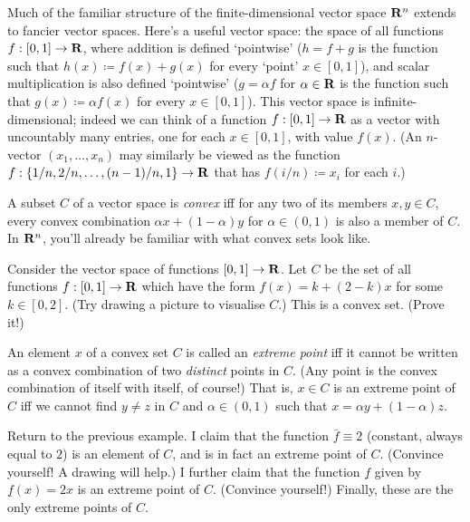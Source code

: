\documentclass[11pt,letterpaper,reqno,oneside]{book}
\begin{document}
\begin{appendices}
Much of the familiar structure of the finite-dimensional vector space $\mathbf{R}^n$ extends to fancier vector spaces.
Here's a useful vector space: the space of all functions $f : [0,1] \to \mathbf{R}$,
where addition is defined `pointwise' ($h = f+g$ is the function such that $h(x) \coloneqq f(x) + g(x)$ for every `point' $x \in [0,1]$),
and scalar multiplication is also defined `pointwise' ($g = \alpha f$ for $\alpha \in \mathbf{R}$ is the function such that $g(x) \coloneqq \alpha f(x)$ for every $x \in [0,1]$).
This vector space is infinite-dimensional;
indeed we can think of a function $f : [0,1] \to \mathbf{R}$ as a vector with uncountably many entries, one for each $x \in [0,1]$, with value $f(x)$.
(An $n$-vector $(x_1,\dots,x_n)$ may similarly be viewed as the function $f : \{1/n,2/n,\dots,(n-1)/n,1\} \to \mathbf{R}$ that has $f(i/n) \coloneqq x_i$ for each $i$.)

A subset $C$ of a vector space is \emph{convex} iff
for any two of its members $x,y \in C$,
every convex combination $\alpha x + (1-\alpha) y$ for $\alpha \in (0,1)$
is also a member of $C$.
In $\mathbf{R}^n$, you'll already be familiar with what convex sets look like.

\setcounter{example}{1}
\begin{example}
	\label{example:fg}
	Consider the vector space of functions $[0,1] \to \mathbf{R}$.
	Let $C$ be the set of all functions $f : [0,1] \to \mathbf{R}$ which have the form
	$f(x) = k + (2-k) x$
	for some $k \in [0,2]$.
	(Try drawing a picture to visualise $C$.)
	This is a convex set. (Prove it!)
\end{example}

An element $x$ of a convex set $C$ is called an \emph{extreme point}
iff it cannot be written as a convex combination of two \emph{distinct} points in $C$. (Any point is the convex combination of itself with itself, of course!)
That is, $x \in C$ is an extreme point of $C$ iff
we cannot find $y \neq z$ in $C$ and $\alpha \in (0,1)$
such that $x = \alpha y + (1-\alpha) z$.

\setcounter{example}{1}
\begin{example}[continued]
	\label{example:fg2}
	Return to the previous example.
	I claim that the function $\bar{f} \equiv 2$ (constant, always equal to $2$) is an element of $C$,
	and is in fact an extreme point of $C$. (Convince yourself! A drawing will help.)
	I further claim that the function $\underline{f}$ given by $\underline{f}(x) = 2x$ is an extreme point of $C$. (Convince yourself!)
	Finally, these are the only extreme points of $C$.
\end{example}


\end{appendices}
\end{document}
